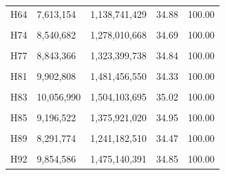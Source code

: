 \documentclass[
  a4paper,
  titlepage]{article}
\begin{document}
\begin{longtable}[t]{lllll}
H64 & 7,613,154 & 1,138,741,429 & 34.88 & 100.00\\
 
\cellcolor{gray!6}{H70} & \cellcolor{gray!6}{9,558,656} & \cellcolor{gray!6}{1,430,545,134} & \cellcolor{gray!6}{34.54} & \cellcolor{gray!6}{100.00}\\
 
H74 & 8,540,682 & 1,278,010,668 & 34.69 & 100.00\\
 
\cellcolor{gray!6}{H76} & \cellcolor{gray!6}{8,612,366} & \cellcolor{gray!6}{1,288,385,839} & \cellcolor{gray!6}{35.28} & \cellcolor{gray!6}{100.00}\\
 
H77 & 8,843,366 & 1,323,399,738 & 34.84 & 100.00\\
 
\cellcolor{gray!6}{H80} & \cellcolor{gray!6}{8,073,386} & \cellcolor{gray!6}{1,208,309,404} & \cellcolor{gray!6}{35.07} & \cellcolor{gray!6}{100.00}\\
 
H81 & 9,902,808 & 1,481,456,550 & 34.33 & 100.00\\
 
\cellcolor{gray!6}{H82} & \cellcolor{gray!6}{8,328,758} & \cellcolor{gray!6}{1,245,977,003} & \cellcolor{gray!6}{34.68} & \cellcolor{gray!6}{100.00}\\
 
H83 & 10,056,990 & 1,504,103,695 & 35.02 & 100.00\\
 
\cellcolor{gray!6}{H84} & \cellcolor{gray!6}{9,404,404} & \cellcolor{gray!6}{1,407,645,958} & \cellcolor{gray!6}{34.84} & \cellcolor{gray!6}{100.00}\\
 
H85 & 9,196,522 & 1,375,921,020 & 34.95 & 100.00\\
 
\cellcolor{gray!6}{H87} & \cellcolor{gray!6}{8,918,526} & \cellcolor{gray!6}{1,334,279,442} & \cellcolor{gray!6}{35.26} & \cellcolor{gray!6}{100.00}\\
 
H89 & 8,291,774 & 1,241,182,510 & 34.47 & 100.00\\
 
\cellcolor{gray!6}{H91} & \cellcolor{gray!6}{7,434,422} & \cellcolor{gray!6}{1,112,660,905} & \cellcolor{gray!6}{34.62} & \cellcolor{gray!6}{100.00}\\
 
H92 & 9,854,586 & 1,475,140,391 & 34.85 & 100.00\\
 

\end{longtable}
\end{document}
